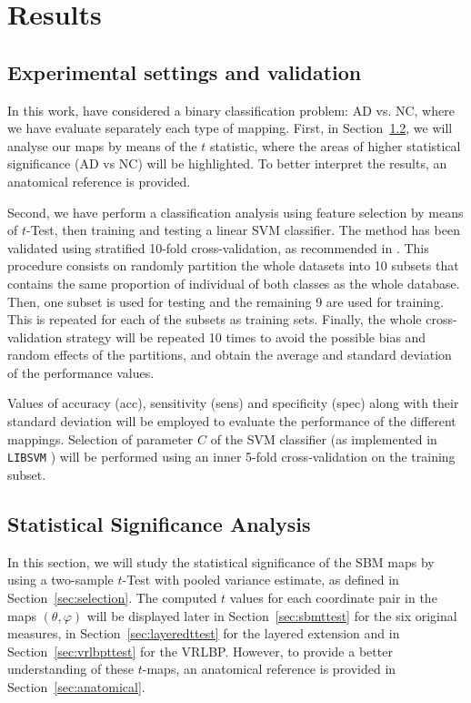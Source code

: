 \section{Results}

\subsection{Experimental settings and validation}\label{sec:experimental}
In this work, have considered a binary classification problem: AD vs. NC, where we have evaluate separately each type of mapping. First, in Section~\ref{sec:significance}, we will analyse our maps by means of the $t$ statistic, where the areas of higher statistical significance (AD vs NC) will be highlighted. To better interpret the results, an anatomical reference is provided.

Second, we have perform a classification analysis using feature selection by means of $t$-Test, then training and testing a linear SVM classifier. The method has been validated using
stratified 10-fold cross-validation, as recommended in \cite{Kohavi1995a}.  This procedure consists on randomly partition the whole datasets into 10 subsets that contains the same proportion of individual of both classes as the whole database. Then, one subset is used for testing and the remaining 9 are used for training. This is repeated for each of the subsets as training sets. Finally, the whole cross-validation strategy will be repeated 10 times to avoid the possible bias and random effects of the partitions, and obtain the average and standard deviation of the performance values. 

Values of accuracy (acc), sensitivity (sens) and specificity (spec) along with their standard deviation  will be employed to evaluate the performance of the different mappings. Selection of parameter $C$ of the SVM classifier (as implemented in \texttt{LIBSVM} \cite{Chang2001}) will be performed using an inner 5-fold cross-validation on the training subset. 

\subsection{Statistical Significance Analysis}\label{sec:significance}
In this section, we will study the statistical significance of the \ac{SBM} maps by using a two-sample $t$-Test with pooled variance estimate, as defined in Section~\ref{sec:selection}. The computed $t$ values for each coordinate pair in the maps $(\theta,\varphi)$ will be displayed later in Section~\ref{sec:sbmttest} for the six original measures, in Section~\ref{sec:layeredttest} for the layered extension and in Section~\ref{sec:vrlbpttest} for the VRLBP. However, to provide a better understanding of these $t$-maps, an anatomical reference is provided in Section~\ref{sec:anatomical}.

